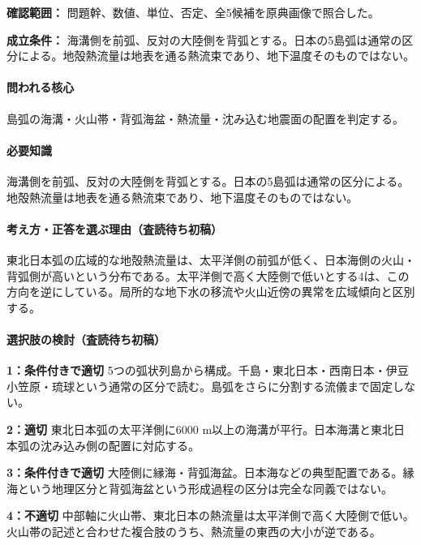 \noindent\textbf{確認範囲：} 問題幹、数値、単位、否定、全5候補を原典画像で照合した。\par

\noindent\textbf{成立条件：} 海溝側を前弧、反対の大陸側を背弧とする。日本の5島弧は通常の区分による。地殻熱流量は地表を通る熱流束であり、地下温度そのものではない。\par

\paragraph{問われる核心} 島弧の海溝・火山帯・背弧海盆・熱流量・沈み込む地震面の配置を判定する。

\paragraph{必要知識} 海溝側を前弧、反対の大陸側を背弧とする。日本の5島弧は通常の区分による。地殻熱流量は地表を通る熱流束であり、地下温度そのものではない。

\paragraph{考え方・正答を選ぶ理由（査読待ち初稿）} 東北日本弧の広域的な地殻熱流量は、太平洋側の前弧が低く、日本海側の火山・背弧側が高いという分布である。太平洋側で高く大陸側で低いとする4は、この方向を逆にしている。局所的な地下水の移流や火山近傍の異常を広域傾向と区別する。

\paragraph{選択肢の検討（査読待ち初稿）}\mbox{}\par

\noindent\textbf{1：条件付きで適切} 5つの弧状列島から構成。千島・東北日本・西南日本・伊豆小笠原・琉球という通常の区分で読む。島弧をさらに分割する流儀まで固定しない。\par

\noindent\textbf{2：適切} 東北日本弧の太平洋側に6000 m以上の海溝が平行。日本海溝と東北日本弧の沈み込み側の配置に対応する。\par

\noindent\textbf{3：条件付きで適切} 大陸側に縁海・背弧海盆。日本海などの典型配置である。縁海という地理区分と背弧海盆という形成過程の区分は完全な同義ではない。\par

\noindent\textbf{4：不適切} 中部軸に火山帯、東北日本の熱流量は太平洋側で高く大陸側で低い。火山帯の記述と合わせた複合肢のうち、熱流量の東西の大小が逆である。\par

